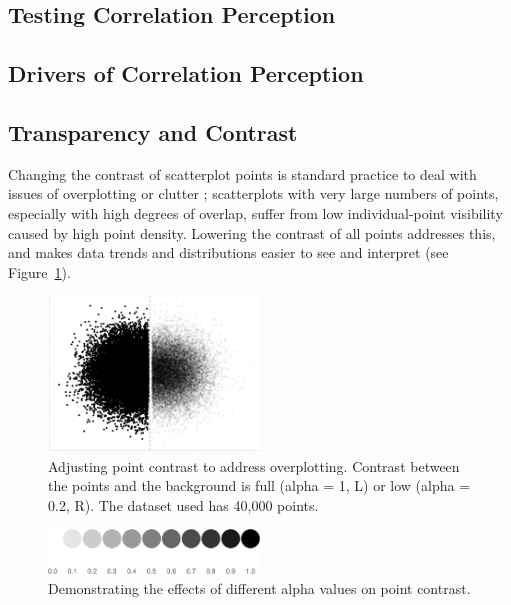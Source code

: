 \documentclass[manuscript, review, anonymous, screen]{acmart}
\begin{document}
\hypertarget{sec-testing-corr-percept}{%
\subsection{Testing Correlation
Perception}\label{sec-testing-corr-percept}}

\hypertarget{sec-drivers}{%
\subsection{Drivers of Correlation Perception}\label{sec-drivers}}

\hypertarget{sec-transparency-and-contrast}{%
\subsection{Transparency and
Contrast}\label{sec-transparency-and-contrast}}

Changing the contrast of scatterplot points is standard practice to deal
with issues of overplotting or clutter
\citep{matejka_2015, bertini_2004}; scatterplots with very large numbers
of points, especially with high degrees of overlap, suffer from low
individual-point visibility caused by high point density. Lowering the
contrast of all points addresses this, and makes data trends and
distributions easier to see and interpret (see
Figure~\ref{fig-overplotting-examples}).

\begin{figure}

\includegraphics[width=0.5\textwidth,height=\textheight]{size_and_contrast_new_files/figure-pdf/fig-overplotting-examples-1.pdf} \hfill{}

\caption{\label{fig-overplotting-examples}Adjusting point contrast to
address overplotting. Contrast between the points and the background is
full (alpha = 1, L) or low (alpha = 0.2, R). The dataset used has 40,000
points.}

\end{figure}

\begin{figure}

\includegraphics[width=0.5\textwidth,height=\textheight]{size_and_contrast_new_files/figure-pdf/fig-alpha-examples-1.pdf} \hfill{}

\caption{\label{fig-alpha-examples}Demonstrating the effects of
different alpha values on point contrast.}

\end{figure}
\end{document}
